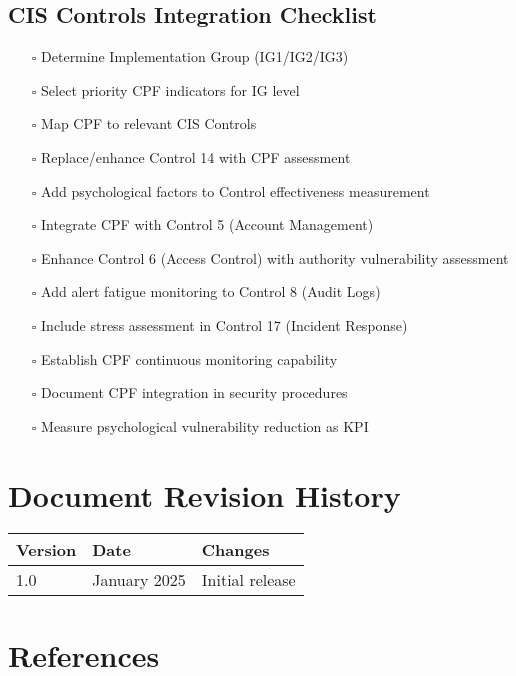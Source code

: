 \documentclass[11pt,a4paper]{article}
\begin{document}
\subsection{CIS Controls Integration Checklist}

\begin{enumerate}
\item[$\square$] Determine Implementation Group (IG1/IG2/IG3)
\item[$\square$] Select priority CPF indicators for IG level
\item[$\square$] Map CPF to relevant CIS Controls
\item[$\square$] Replace/enhance Control 14 with CPF assessment
\item[$\square$] Add psychological factors to Control effectiveness measurement
\item[$\square$] Integrate CPF with Control 5 (Account Management)
\item[$\square$] Enhance Control 6 (Access Control) with authority vulnerability assessment
\item[$\square$] Add alert fatigue monitoring to Control 8 (Audit Logs)
\item[$\square$] Include stress assessment in Control 17 (Incident Response)
\item[$\square$] Establish CPF continuous monitoring capability
\item[$\square$] Document CPF integration in security procedures
\item[$\square$] Measure psychological vulnerability reduction as KPI
\end{enumerate}

\section*{Document Revision History}

\begin{table}[h]
\centering
\begin{tabular}{llp{8cm}}
\toprule
\textbf{Version} & \textbf{Date} & \textbf{Changes} \\
\midrule
1.0 & January 2025 & Initial release \\
\bottomrule
\end{tabular}
\end{table}

\section*{References}
\end{document}
